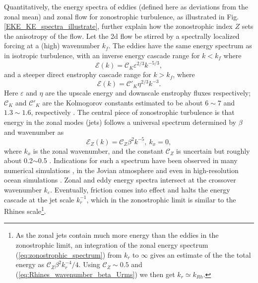\documentclass{jfm}
\begin{document}
Quantitatively, the energy spectra of eddies (defined here as deviations
from the zonal mean) and zonal flow for zonostrophic turbulence, as 
illustrated in Fig. \ref{EKE_KE_spectra_illustrate}, further
explain how the zonostrophic index $Z$ sets the anisotropy of the flow. 
Let the 2d flow be stirred by a spectrally localized forcing at a (high) wavenumber $k_{f}$.
The eddies have the same energy spectrum as in isotropic turbulence,
with an inverse energy cascade range for $k<k_f$ where
\begin{equation}
    \mathcal{E}(k)=\mathcal{C}_K\varepsilon^{2/3}k^{-5/3},\label{eq:Kolmogorov_Kraichnan_spectrum_energy}
\end{equation}
and a steeper direct enstrophy cascade range for $k>k_f$, where
\begin{equation}
    \mathcal{E}(k)=\mathcal{C'}_K\eta^{2/3}k^{-3}.\label{eq:Kolmogorov_Kraichnan_spectrum_enstrophy}
\end{equation}
Here $\varepsilon$ and $\eta$ are the upscale energy and downscale enstrophy
fluxes respectively; $\mathcal{C}_K$ and $\mathcal{C'}_K$ 
are the Kolmogorov constants estimated to be about $6\sim7$ and $1.3\sim1.6$, respectively
\citep{Maltrud1991,Smith1993,Paret1997,Chen2006,Borue1993,Gotoh1998}.
The central piece of zonostrophic turbulence is that 
energy in the zonal modes (jets) follows a universal spectrum determined
by $\beta$ and wavenumber as
\begin{equation}
\mathcal{E}_{Z}(k)=\mathcal{C}_Z\beta^{2}k^{-5},\ k_{x}=0,\label{eq:zonostrophic_spectrum}
\end{equation}
where $k_{x}$ is the zonal wavenumber, and the constant $\mathcal{C}_Z$
is uncertain but roughly about 0.2$\sim$0.5 \citep{Sukoriansky2002,Galperin2010,Smith2005}.
Indications for such a spectrum have been observed in many numerical simulations 
\citep{Chekhlov1996,Smith2002,Huang2001,Sukoriansky2002,Sukoriansky2007},
in the Jovian atmosphere \citep{Sukoriansky2002,Choi2011,Galperin2014}
and even in high-resolution ocean simulations \citep{Galperin2004}.
Zonal and eddy energy spectra intersect at the crossover wavenumber $k_{\varepsilon}$.
Eventually, friction comes into effect and halts the energy 
cascade at the jet scale $k_r^{-1}$,
which in the zonostrophic limit is similar to the Rhines scale\footnote{
As the zonal jets contain much more energy than the eddies in the zonostrophic limit, 
an integration of the zonal energy spectrum (\ref{eq:zonostrophic_spectrum})  from $k_{r}$ to $\infty$ gives an estimate of the
the total energy as $\mathcal{C}_Z\beta^{2}k_{r}^{-4}/4$. Using $\mathcal{C}_Z\sim 0.5$ and
(\ref{eq:Rhines_wavenumber_beta_Urms}) we then get $k_{r}\simeq k_{Rh}$.}.
\end{document}
